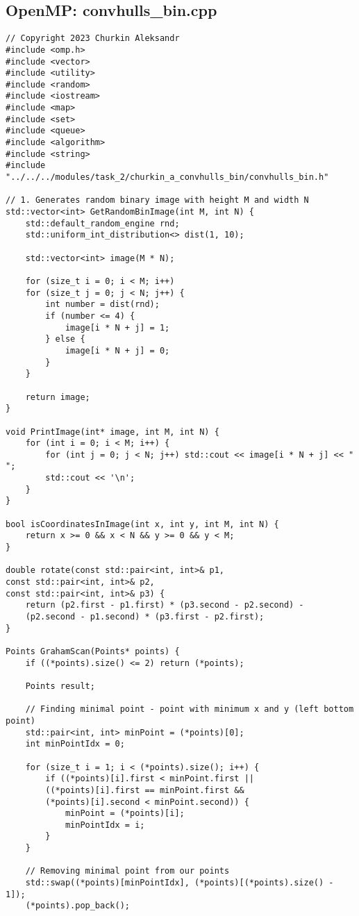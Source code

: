 \documentclass[14pt, russian]{extarticle}
\begin{document}
	\subsection{OpenMP: convhulls\_bin.cpp}
	\begin{lstlisting}
// Copyright 2023 Churkin Aleksandr
#include <omp.h>
#include <vector>
#include <utility>
#include <random>
#include <iostream>
#include <map>
#include <set>
#include <queue>
#include <algorithm>
#include <string>
#include "../../../modules/task_2/churkin_a_convhulls_bin/convhulls_bin.h"

// 1. Generates random binary image with height M and width N
std::vector<int> GetRandomBinImage(int M, int N) {
	std::default_random_engine rnd;
	std::uniform_int_distribution<> dist(1, 10);
	
	std::vector<int> image(M * N);
	
	for (size_t i = 0; i < M; i++)
	for (size_t j = 0; j < N; j++) {
		int number = dist(rnd);
		if (number <= 4) {
			image[i * N + j] = 1;
		} else {
			image[i * N + j] = 0;
		}
	}
	
	return image;
}

void PrintImage(int* image, int M, int N) {
	for (int i = 0; i < M; i++) {
		for (int j = 0; j < N; j++) std::cout << image[i * N + j] << " ";
		std::cout << '\n';
	}
}

bool isCoordinatesInImage(int x, int y, int M, int N) {
	return x >= 0 && x < N && y >= 0 && y < M;
}

double rotate(const std::pair<int, int>& p1,
const std::pair<int, int>& p2,
const std::pair<int, int>& p3) {
	return (p2.first - p1.first) * (p3.second - p2.second) -
	(p2.second - p1.second) * (p3.first - p2.first);
}

Points GrahamScan(Points* points) {
	if ((*points).size() <= 2) return (*points);
	
	Points result;
	
	// Finding minimal point - point with minimum x and y (left bottom point)
	std::pair<int, int> minPoint = (*points)[0];
	int minPointIdx = 0;
	
	for (size_t i = 1; i < (*points).size(); i++) {
		if ((*points)[i].first < minPoint.first ||
		((*points)[i].first == minPoint.first &&
		(*points)[i].second < minPoint.second)) {
			minPoint = (*points)[i];
			minPointIdx = i;
		}
	}
	
	// Removing minimal point from our points
	std::swap((*points)[minPointIdx], (*points)[(*points).size() - 1]);
	(*points).pop_back();
	

\end{lstlisting}
\end{document}
